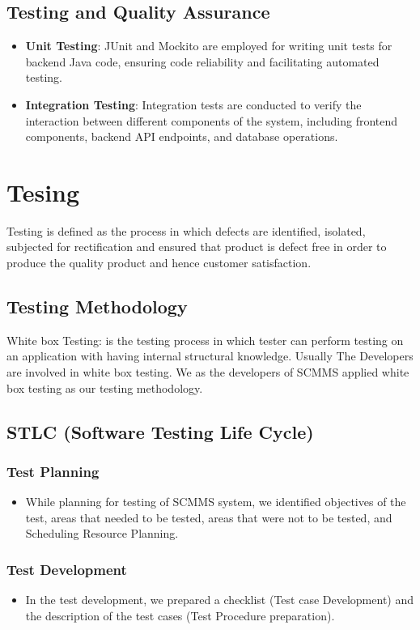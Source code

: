 \documentclass[a4paper, 12pt]{report}
\begin{document}
\subsection{Testing and Quality Assurance}
\begin{itemize}
  \item \textbf{Unit Testing}: JUnit and Mockito are employed for writing unit tests for backend Java code, ensuring code reliability and facilitating automated testing.
  \item \textbf{Integration Testing}: Integration tests are conducted to verify the interaction between different components of the system, including frontend components, backend API endpoints, and database operations.
 
\end{itemize}
\section{Tesing}
\noindent Testing is defined as the process in which defects are identified, isolated, subjected for
rectification and ensured that product is defect free in order to produce the quality product and
hence customer satisfaction.
\subsection{Testing Methodology}
White box Testing: is the testing process in which tester can perform testing on an application
with having internal structural knowledge. Usually The Developers are involved in white box
testing. We as the developers of SCMMS applied white box testing as our testing methodology.

\subsection{STLC (Software Testing Life Cycle)}

\subsubsection*{Test Planning}
\begin{itemize}
    \item While planning for testing of SCMMS system, we identified objectives of the test, areas that needed to be tested, areas that were not to be tested, and Scheduling Resource Planning.
\end{itemize}

\subsubsection{Test Development}
\begin{itemize}
    \item In the test development, we prepared a checklist (Test case Development) and the description of the test cases (Test Procedure preparation).
\end{itemize}
\end{document}
